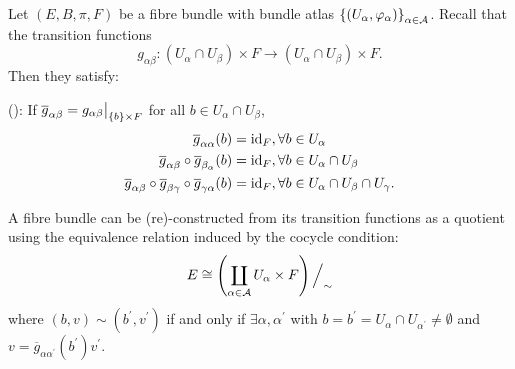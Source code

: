 \documentclass[main.tex]{subfiles}
\begin{document}
Let $(E, B,\pi, F)$ be a fibre bundle with bundle atlas $\left\{ \left(  U_\alpha, \varphi_\alpha  \right) \right\}_{\alpha \in \mathcal{A}}$. Recall that the transition functions
\[
g_{\alpha\beta} : (U_\alpha \cap U_\beta ) \times F \longrightarrow (U_\alpha \cap U_\beta) \times F.
\]
Then they satisfy:
\begin{lemma}
(): If $\overline{g}_{\alpha\beta} = g_{\alpha\beta}\big|_{\left\{b\right\}\times F}$ for all $b \in U_\alpha \cap U_\beta$,
\begin{align*}
    \overline{g}_{\alpha\alpha}(b) &= \text{id}_{F}, \forall b \in U_\alpha \\
    \overline{g}_{\alpha\beta} \circ \overline{g}_{\beta_\alpha}(b) &= \text{id}_{F} , \forall b \in U_\alpha \cap U_\beta \\
    \overline{g}_{\alpha\beta} \circ \overline{g}_{\beta\gamma} \circ \overline{g}_{\gamma \alpha}(b) &= \text{id}_{F} , \forall b \in U_\alpha \cap U_\beta \cap U_\gamma.
\end{align*}
\end{lemma}

\begin{rmk}
A fibre bundle can be (re)-constructed from its transition functions as a quotient using the equivalence relation induced by the cocycle condition:
\[
E \cong \left( \coprod_{\alpha \in \mathcal{A}} U_\alpha \times F \right)\Big/_\sim
\] where $(b,v) \sim (b^\prime, v^\prime)$ if and only if $\exists \alpha, \alpha^\prime$ with $b= b^\prime = U_\alpha \cap U_{\alpha^\prime} \neq \emptyset$ and $v = \overline{g}_{\alpha\alpha^\prime }(b^\prime)v^\prime$.
\end{rmk}
\end{document}
